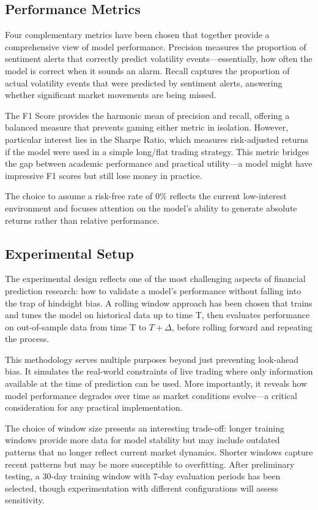 \documentclass[11pt,twocolumn]{article}
\begin{document}
\subsection{\textbf{Performance Metrics}}
Four complementary metrics have been chosen that together provide a comprehensive view of model performance. Precision measures the proportion of sentiment alerts that correctly predict volatility events—essentially, how often the model is correct when it sounds an alarm. Recall captures the proportion of actual volatility events that were predicted by sentiment alerts, answering whether significant market movements are being missed.

The F1 Score provides the harmonic mean of precision and recall, offering a balanced measure that prevents gaming either metric in isolation. However, particular interest lies in the Sharpe Ratio, which measures risk-adjusted returns if the model were used in a simple long/flat trading strategy. This metric bridges the gap between academic performance and practical utility—a model might have impressive F1 scores but still lose money in practice.

The choice to assume a risk-free rate of 0\% reflects the current low-interest environment and focuses attention on the model's ability to generate absolute returns rather than relative performance.

\subsection{\textbf{Experimental Setup}}
The experimental design reflects one of the most challenging aspects of financial prediction research: how to validate a model's performance without falling into the trap of hindsight bias. A rolling window approach has been chosen that trains and tunes the model on historical data up to time T, then evaluates performance on out-of-sample data from time T to $T+\Delta$, before rolling forward and repeating the process.

This methodology serves multiple purposes beyond just preventing look-ahead bias. It simulates the real-world constraints of live trading where only information available at the time of prediction can be used. More importantly, it reveals how model performance degrades over time as market conditions evolve—a critical consideration for any practical implementation.

The choice of window size presents an interesting trade-off: longer training windows provide more data for model stability but may include outdated patterns that no longer reflect current market dynamics. Shorter windows capture recent patterns but may be more susceptible to overfitting. After preliminary testing, a 30-day training window with 7-day evaluation periods has been selected, though experimentation with different configurations will assess sensitivity.
\end{document}

